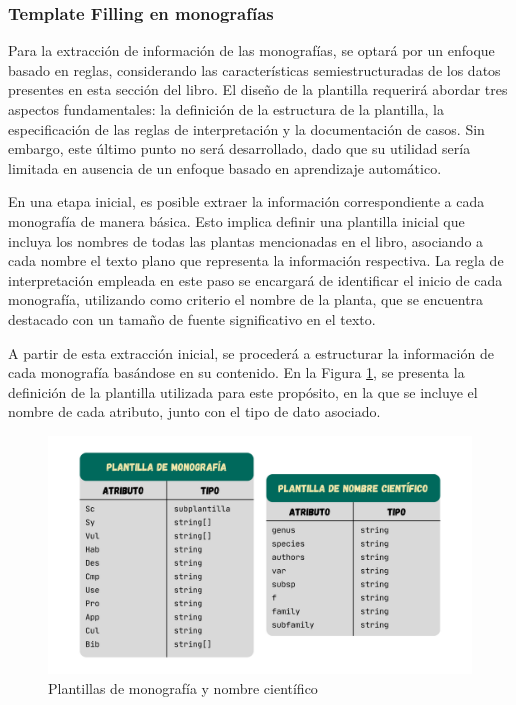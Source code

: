 \subsubsection{Template Filling en monografías}
Para la extracción de información de las monografías, se optará por un enfoque basado en reglas, 
considerando las características semiestructuradas de los datos presentes en esta sección del libro. 
El diseño de la plantilla requerirá abordar tres aspectos fundamentales: la definición 
de la estructura de la plantilla, la especificación de las reglas de interpretación 
y la documentación de casos. Sin embargo, este último punto no será desarrollado, 
dado que su utilidad sería limitada en ausencia de un enfoque basado en aprendizaje automático.

En una etapa inicial, es posible extraer la información correspondiente a cada monografía 
de manera básica. Esto implica definir una plantilla inicial que incluya los nombres de 
todas las plantas mencionadas en el libro, asociando a cada nombre el texto plano que 
representa la información respectiva. La regla de interpretación empleada en este paso se 
encargará de identificar el inicio de cada monografía, utilizando como criterio el nombre de 
la planta, que se encuentra destacado con un tamaño de fuente significativo en el texto.

A partir de esta extracción inicial, se procederá a estructurar la información de cada monografía 
basándose en su contenido. En la Figura \ref{fig:template-monograph}, se presenta la definición de la plantilla utilizada 
para este propósito, en la que se incluye el nombre de cada atributo, junto con el tipo de dato asociado.

\begin{figure}[ht!]
    \centering
    \includegraphics[width=1\textwidth]{Images/monograph-template.png}
    \caption{Plantillas de monografía y nombre científico}
    \label{fig:template-monograph}
\end{figure}

